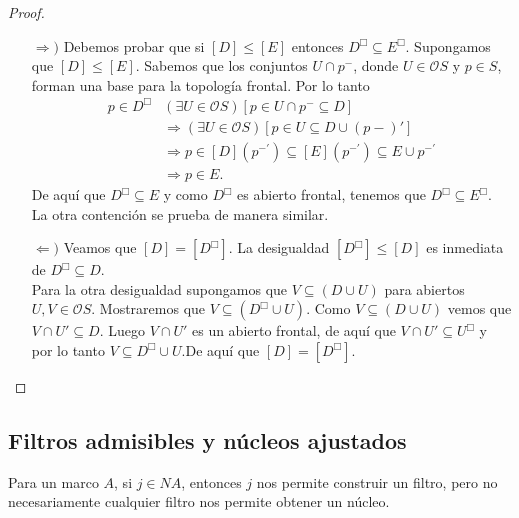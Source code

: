 \begin{proof}
    \begin{itemize}
        \item[$\Rightarrow )$] Debemos probar que si $[D]\leq [E]$ entonces $D^\Box\subseteq E^\Box$. Supongamos que $[D]\leq [E]$. Sabemos que los conjuntos $U\cap p^-$, donde $U\in \mathcal{O}S$ y $p\in S$, forman una base para la topología frontal. Por lo tanto 
        \[
        \begin{split}
            p\in D^\Box & (\exists U\in \mathcal{O}S)[p\in U\cap p^-\subseteq D]\\
            & \Rightarrow (\exists U\in \mathcal{O}S)[p\in U\subseteq D\cup (p-)']\\
            & \Rightarrow p\in [D](p^{-'})\subseteq [E](p^{-'})\subseteq E\cup p^{-'}\\
            & \Rightarrow p\in E.
        \end{split}
        \]
        De aquí que $D^\Box\subseteq E$ y como $D^\Box$ es abierto frontal, tenemos que $D^\Box\subseteq E^\Box$.\\

        La otra contención se prueba de manera similar.
        
        \item[$\Leftarrow )$] Veamos que $[D]=[D^\Box]$. La desigualdad $[D^\Box]\leq [D]$ es inmediata de $D^\Box \subseteq D$.\\
        
        Para la otra desigualdad supongamos que $V\subseteq (D\cup U)$ para abiertos $U, V\in \mathcal{O}S$. Mostraremos que $V\subseteq (D^\Box\cup U)$. Como $V\subseteq (D\cup U)$ vemos que $V\cap U'\subseteq D$. Luego $V\cap U'$ es un abierto frontal, de aquí que $V\cap U'\subseteq U^\Box$ y por lo tanto $V\subseteq D^\Box\cup U$.De aquí que $[D]=[D^\Box]$.
    \end{itemize}
\end{proof}

\subsection{Filtros admisibles y núcleos ajustados}

Para un marco $A$, si $j\in NA$, entonces $j$ nos permite construir un filtro, pero no necesariamente cualquier filtro nos permite obtener un núcleo.

